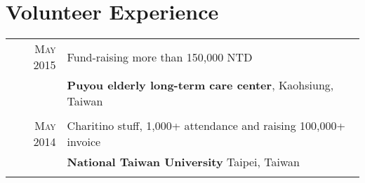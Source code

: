\documentclass[a4paper,10pt]{article} %
\begin{document}
\section{Volunteer Experience }
\begin{tabular}{r|p{11cm}}

\textsc{May} 2015& Fund-raising more than 150,000 NTD\\
&\normalsize\textbf{Puyou elderly long-term care center}, Kaohsiung, Taiwan\\
&\\

\textsc{May} 2014& Charitino stuff, 1,000+ attendance and raising 100,000+ invoice \\
&\normalsize\textbf{National Taiwan University} Taipei, Taiwan\\
&\\

\end{tabular}


\end{document}
